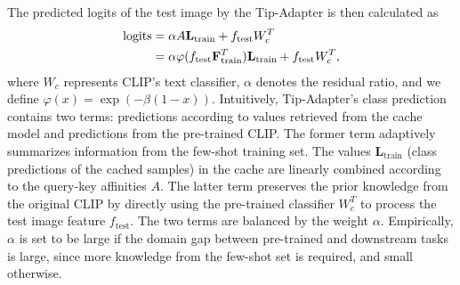 \documentclass[10pt,twocolumn,letterpaper]{article}
\begin{document}
The predicted logits of the test image by the Tip-Adapter is then calculated as
\begin{align}
\label{logits}
    \mathrm{logits} &= \alpha A \mathbf{L}_\mathrm{train} + f_\mathrm{test} W_c^T \notag \\
    &= \alpha \varphi(f_\mathrm{test} \mathbf{F}^T_{\rm train}) \mathbf{L}_\mathrm{train} + f_\mathrm{test} W_c^T,
\end{align}
where $W_c$ represents CLIP's text classifier, $\alpha$ denotes the residual ratio, and we define $\varphi(x) = \exp(-\beta(1 - x))$.
Intuitively, Tip-Adapter's class prediction contains two terms: predictions according to values retrieved from the cache model and predictions from the pre-trained CLIP. The former term adaptively summarizes information from the few-shot training set. The values $\mathbf{L}_\mathrm{train}$ (class predictions of the cached samples) in the cache are linearly combined according to the query-key affinities $A$. The latter term preserves the prior knowledge from the original CLIP by directly using the pre-trained classifier $W_c^T$ to process the test image feature $f_\mathrm{test}$. The two terms are balanced by the weight $\alpha$. Empirically, $\alpha$ is set to be large if the domain gap between pre-trained and downstream tasks is large, since more knowledge from the few-shot set is required, and small otherwise.
\end{document}
